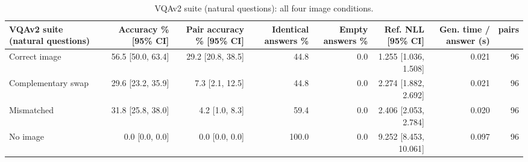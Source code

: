 \begin{table}[t]
\centering\small
\begin{tabular}{lrrrrrrr}
\toprule
VQAv2 suite (natural questions) & Accuracy \% [95\% CI] & Pair accuracy \% [95\% CI] & Identical answers \% & Empty answers \% & Ref. NLL [95\% CI] & Gen. time / answer (s) & pairs \\
\midrule
Correct image & 56.5 [50.0, 63.4] & 29.2 [20.8, 38.5] & 44.8 & 0.0 & 1.255 [1.036, 1.508] & 0.021 & 96 \\
Complementary swap & 29.6 [23.2, 35.9] & 7.3 [2.1, 12.5] & 44.8 & 0.0 & 2.274 [1.882, 2.692] & 0.021 & 96 \\
Mismatched & 31.8 [25.8, 38.0] & 4.2 [1.0, 8.3] & 59.4 & 0.0 & 2.406 [2.053, 2.784] & 0.020 & 96 \\
No image & 0.0 [0.0, 0.0] & 0.0 [0.0, 0.0] & 100.0 & 0.0 & 9.252 [8.453, 10.061] & 0.097 & 96 \\
\bottomrule
\end{tabular}
\caption{VQAv2 suite (natural questions): all four image conditions.}
\label{tab:task2_vqav2_suite}
\end{table}
